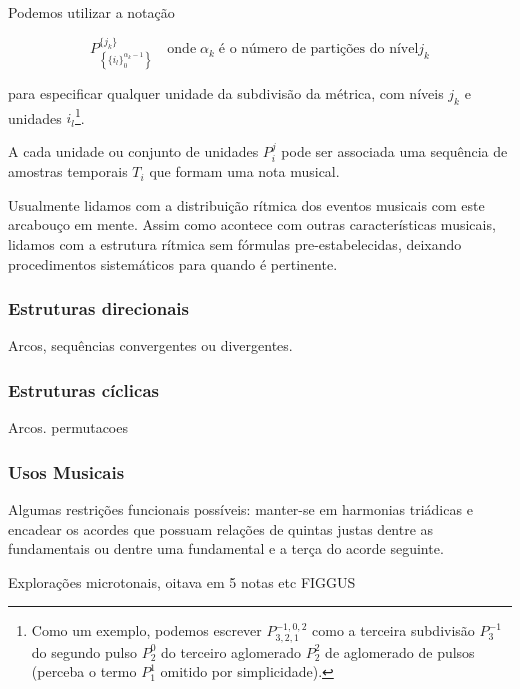 Podemos utilizar a notação

\begin{equation}
P^{ \{ j_k \} }_{\left \{ \{ i_{l} \}_0^{\alpha_{k}-1} \right \} } \quad \text{onde}\; \alpha_k \; \text{é o número de partições do nível} j_k
\end{equation}

para especificar qualquer unidade da subdivisão da métrica, com níveis $j_k$ e unidades $i_l$\footnote{Como um exemplo, podemos escrever $P^{-1,0,2}_{3,2,1}$  como a terceira subdivisão $P^{-1}_3$ do segundo
pulso $P^0_2$ do terceiro aglomerado $P^2_2$ de aglomerado de pulsos (perceba o termo $P^1_1$ omitido por simplicidade).}.

A cada unidade ou conjunto de unidades $P_i^j$ pode ser associada uma sequência de amostras temporais $T_i$
que formam uma nota musical. 

Usualmente lidamos com a distribuição rítmica dos eventos musicais com este arcabouço em mente. Assim como acontece com outras características
musicais, lidamos com a estrutura rítmica sem fórmulas pre-estabelecidas, deixando procedimentos sistemáticos para quando é pertinente.


\subsubsection{Estruturas direcionais}
Arcos, sequências convergentes ou divergentes.

\subsubsection{Estruturas cíclicas}
Arcos. permutacoes





\subsubsection{Usos Musicais}
Algumas restrições funcionais possíveis: manter-se em harmonias triádicas e encadear os acordes
que possuam relações de quintas justas dentre as fundamentais ou dentre uma fundamental
e a terça do acorde seguinte.

Explorações microtonais, oitava em 5 notas etc
FIGGUS














